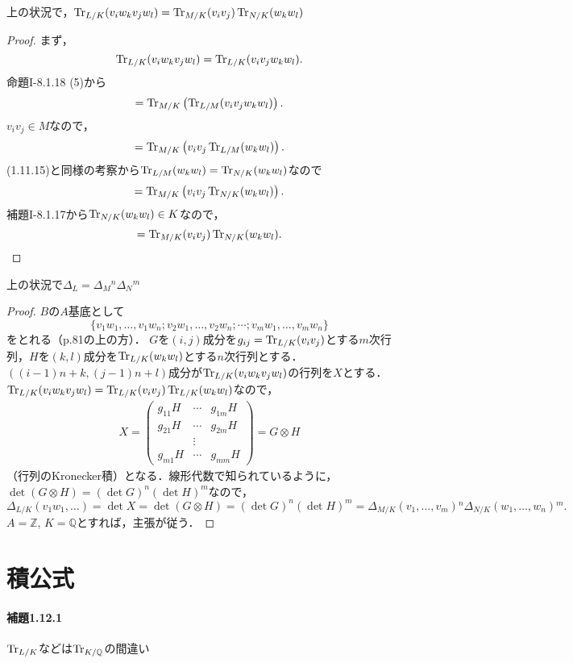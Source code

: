 \begin{screen}
  上の状況で，$\operatorname{Tr}_{L/K}(v_iw_kv_jw_l)=\operatorname{Tr}_{M/K}(v_iv_j)\operatorname{Tr}_{N/K}(w_kw_l)$
\end{screen}
\begin{proof}
  まず，
  \[\operatorname{Tr}_{L/K}(v_iw_kv_jw_l)=\operatorname{Tr}_{L/K}(v_iv_jw_kw_l).\]
  命題I-8.1.18 (5)から
  \[=\operatorname{Tr}_{M/K}\left(\operatorname{Tr}_{L/M}(v_iv_jw_kw_l)\right).\]
  $v_iv_j\in M$なので，
  \[=\operatorname{Tr}_{M/K}\left(v_iv_j\operatorname{Tr}_{L/M}(w_kw_l)\right).\]
  (1.11.15)と同様の考察から$\operatorname{Tr}_{L/M}(w_kw_l)=\operatorname{Tr}_{N/K}(w_kw_l)$なので
  \[=\operatorname{Tr}_{M/K}\left(v_iv_j\operatorname{Tr}_{N/K}(w_kw_l)\right).\]
  補題I-8.1.17から$\operatorname{Tr}_{N/K}(w_kw_l)\in K$なので，
  \[=\operatorname{Tr}_{M/K}(v_iv_j)\operatorname{Tr}_{N/K}(w_kw_l).\]
\end{proof}

\begin{screen}
  上の状況で$\varDelta_L=\varDelta_M{}^n\varDelta_N{}^m$
\end{screen}
\begin{proof}
  $B$の$A$基底として
  \[\{v_1w_1,\ldots,v_1w_n;v_2w_1,\ldots,v_2w_n;\cdots;v_mw_1,\ldots,v_mw_n\}\]
  をとれる（p.81の上の方）．
  $G$を$(i,j)$成分を$g_{ij}=\operatorname{Tr}_{L/K}(v_iv_j)$とする$m$次行列，$H$を$(k,l)$成分を$\operatorname{Tr}_{L/K}(w_kw_l)$とする$n$次行列とする．
  $((i-1)n+k,(j-1)n+l)$成分が$\operatorname{Tr}_{L/K}(v_iw_kv_jw_l)$の行列を$X$とする．
  $\operatorname{Tr}_{L/K}(v_iw_kv_jw_l)=\operatorname{Tr}_{L/K}(v_iv_j)\operatorname{Tr}_{L/K}(w_kw_l)$なので，
  \begin{align*}
    X=
    \begin{pmatrix}
      g_{11}H & \cdots & g_{1m}H \\
      g_{21}H & \cdots & g_{2m}H \\
      & \vdots & \\
      g_{m1}H & \cdots & g_{mm}H
    \end{pmatrix}
    =G\otimes H
  \end{align*}
  （行列のKronecker積）となる．線形代数で知られているように，$\det(G\otimes H)=(\det G)^n(\det H)^m$なので，
  \[\varDelta_{L/K}(v_1w_1,\ldots)=\det X=\det(G\otimes H)=(\det G)^n(\det H)^m=\varDelta_{M/K}(v_1,\ldots,v_m){}^n\varDelta_{N/K}(w_1,\ldots,w_n){}^m.\]
  $A=\mathbb{Z}$, $K=\mathbb{Q}$とすれば，主張が従う．
\end{proof}


\section{積公式}
\paragraph{補題1.12.1}
$\operatorname{Tr}_{L/K}$などは$\operatorname{Tr}_{K/\mathbb{Q}}$の間違い


